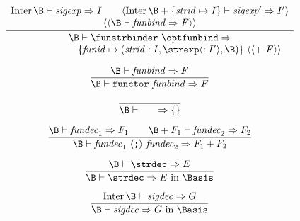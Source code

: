 %
\begin{equation}	%
\frac{
      \begin{array}{c}
      \Inter\B\ts\sigexp\ra\I\qquad
      \langle\Inter\B+\{\strid\mapsto\I\} \ts\sigexp'\ra\I'\rangle \\
       \langle\langle\B\ts\funbind\ra\F\rangle\rangle
      \end{array}
     }
     {
      \begin{array}{c}
       \B\ts\funstrbinder\ \optfunbind\ra\\
       \qquad\qquad \qquad
              \{\funid\mapsto(\strid:\I,\strexp\langle:\I'\rangle,\B)\}
              \ \langle\langle +\ \F\rangle\rangle
      \end{array}
     }\index{62.5}
\end{equation}

\begin{equation}        %
\frac{ \B\ts\funbind\ra\F }
     { \B\ts\singfundec\ra\F }\index{63.1}
\end{equation}

\vspace{6pt}
\begin{equation}        %
\frac{}
     { \B\ts\emptyfundec\ra\emptymap }
\end{equation}

\vspace{6pt}
\begin{equation}        %
\frac{ \B\ts\fundec_1\ra\F_1\qquad
       \B+\F_1\ts\fundec_2\ra\F_2 }
     { \B\ts\seqfundec\ra\plusmap{\F_1}{\F_2} }
\end{equation}

\begin{equation}	%
\frac{\B\ts\strdec\ra\E}
     {\B\ts\strdec\ra\E\ \In\ \Basis
     }\index{63.2}
\end{equation}

\vspace{6pt}
\begin{equation}	%
\frac{\Inter\B\ts\sigdec\ra\G}
     {\B\ts\sigdec\ra\G\ \In\ \Basis
     }
\end{equation}

